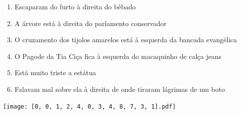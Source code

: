 \documentclass[12pt]{article}
\begin{document}
		 

\pagebreak


	\begin{enumerate}
		  \sffamily %
		  \large %


\vfill \item
Escaparam do furto	%
à direita
do bêbado	%

\vfill \item
A árvore está	%
à direita
do parlamento conservador	%

\vfill \item
O cruzamento dos tijolos amarelos está	%
à esquerda
da bancada evangélica	%

\vfill \item
O Pagode da Tia Ciça fica	%
à esquerda
do macaquinho de calça jeans	%

\vfill \item
Está muito triste	%
a estátua	%

\vfill \item
Falavam mal sobre ela	%
à direita
de onde tiraram lágrimas de um boto	%
	\end{enumerate}
		  
		  \hfill

		  \vfill

\texttt{[image: [0, 0, 1, 2, 4, 0, 3, 4, 8, 7, 3, 1].pdf]}


	\hfill	  	  


\pagebreak			
\end{document}
